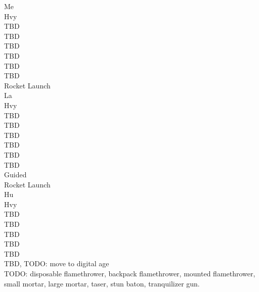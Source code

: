 \documentclass[letterpaper,titlepage,openany,twocolumn]{book}
\begin{document}
Me\\
Hvy\\
TBD\\
TBD\\
TBD\\
TBD\\
TBD\\
TBD\\
Rocket Launch\\
La\\
Hvy\\
TBD\\
TBD\\
TBD\\
TBD\\
TBD\\
TBD\\
Guided\\
Rocket Launch\\
Hu\\
Hvy\\
TBD\\
TBD\\
TBD\\
TBD\\
TBD\\
TBD, TODO: move to digital age\\

TODO: disposable flamethrower, backpack flamethrower, mounted flamethrower, small mortar, large mortar, taser, stun baton, tranquilizer gun.\\
\end{document}
